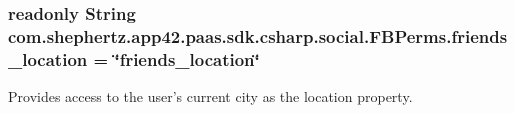 \hypertarget{classcom_1_1shephertz_1_1app42_1_1paas_1_1sdk_1_1csharp_1_1social_1_1_f_b_perms_a47070710fb96f9fb77740f52b7e13b31}{
\subsubsection[{friends\+\_\+location}]{\setlength{\rightskip}{0pt plus 5cm}readonly String com.\+shephertz.\+app42.\+paas.\+sdk.\+csharp.\+social.\+F\+B\+Perms.\+friends\+\_\+location = \char`\"{}friends\+\_\+location\char`\"{}\hspace{0.3cm}{\ttfamily [static]}}}\label{classcom_1_1shephertz_1_1app42_1_1paas_1_1sdk_1_1csharp_1_1social_1_1_f_b_perms_a47070710fb96f9fb77740f52b7e13b31}


Provides access to the user's current city as the location property. 

